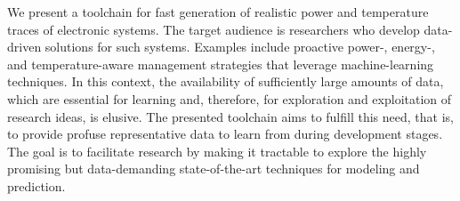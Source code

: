 We present a toolchain for fast generation of realistic power and temperature
traces of electronic systems. The target audience is researchers who develop
data-driven solutions for such systems. Examples include proactive
\mbox{power-,} \mbox{energy-,} and temperature-aware management strategies that
leverage machine-learning techniques. In this context, the availability of
sufficiently large amounts of data, which are essential for learning and,
therefore, for exploration and exploitation of research ideas, is elusive. The
presented toolchain aims to fulfill this need, that is, to provide profuse
representative data to learn from during development stages. The goal is to
facilitate research by making it tractable to explore the highly promising but
data-demanding state-of-the-art techniques for modeling and prediction.
